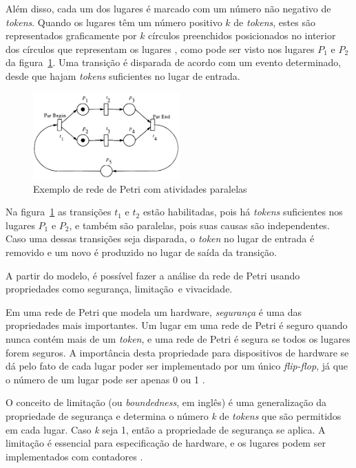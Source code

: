 Além disso, cada um dos lugares é marcado com um número não negativo de \textit{tokens}. Quando os lugares têm um número positivo $k$ de \textit{tokens}, estes são representados graficamente por $k$ círculos preenchidos posicionados no interior dos círculos que representam os lugares \cite{murata:1989}, como pode ser visto nos lugares $P_1$ e $P_2$ da figura~\ref{fig:petrinet}. Uma transição é disparada de acordo com um evento determinado, desde que hajam \textit{tokens} suficientes no lugar de entrada.

\begin{figure}[ht]
	\caption{\label{fig:petrinet}Exemplo de rede de Petri com atividades paralelas}
	\begin{center}
	    \includegraphics[width=0.5\textwidth]{resources/petri_net_murata_1}
	\end{center}
\end{figure}

Na figura~\ref{fig:petrinet} as transições $t_1$ e $t_2$ estão habilitadas, pois há \textit{tokens} suficientes nos lugares $P_1$ e $P_2$, e também são paralelas, pois suas causas são independentes. Caso uma dessas transições seja disparada, o \textit{token} no lugar de entrada é removido e um novo é produzido no lugar de saída da transição.

A partir do modelo, é possível fazer a análise da rede de Petri usando propriedades como segurança, limitação\ e vivacidade.

Em uma rede de Petri que modela um hardware, \textit{segurança} é uma das propriedades mais importantes. Um lugar em uma rede de Petri é seguro quando nunca contém mais de um \textit{token}, e uma rede de Petri é segura se todos os lugares forem seguros. A importância desta propriedade para dispositivos de hardware se dá pelo fato de cada lugar poder ser implementado por um único \textit{flip-flop}, já que o número de um lugar pode ser apenas 0 ou 1 \cite{peterson:1981}.

O conceito de limitação (ou \textit{boundedness}, em inglês) é uma generalização da propriedade de segurança e determina o número \textit{k} de \textit{tokens} que são permitidos em cada lugar. Caso \textit{k} seja 1, então a propriedade de segurança se aplica. A limitação é essencial para especificação de hardware, e os lugares podem ser implementados com contadores \cite{peterson:1981}.

